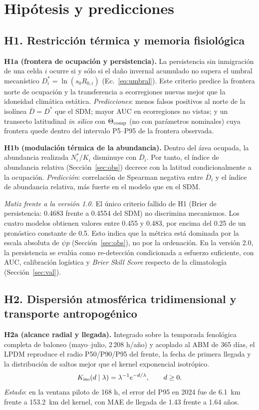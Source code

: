 \documentclass[11pt,letterpaper]{article}
\begin{document}
\section{Hipótesis y predicciones}
\label{sec:hip}
\subsection{H1. Restricción térmica y memoria fisiológica}
\textbf{H1a (frontera de ocupación y persistencia).} La persistencia sin inmigración de una celda $i$ ocurre si y sólo si el daño invernal acumulado no supera el umbral mecanístico $D^\ast_i=\ln(s_0R_{0,i})$ (Ec.~\ref{eq:umbral}). Este criterio predice la frontera norte de ocupación y la transferencia a ecorregiones nuevas mejor que la idoneidad climática estática.
\emph{Predicciones}: menos falsos positivos al norte de la isolínea $\overline D=D^\ast$ que el SDM; mayor AUC en ecorregiones no vistas; y un transecto latitudinal \emph{in silico} con $\Theta_{\rm comp}$ (no con parámetros nominales) cuya frontera quede dentro del intervalo P5--P95 de la frontera observada.

\textbf{H1b (modulación térmica de la abundancia).} Dentro del área ocupada, la abundancia realizada $N^\ast_i/K_i$ disminuye con $\overline D_i$. Por tanto, el índice de abundancia relativa (Sección~\ref{sec:obs}) decrece con la latitud condicionalmente a la ocupación.
\emph{Predicción}: correlación de Spearman negativa entre $\overline D_i$ y el índice de abundancia relativa, más fuerte en el modelo que en el SDM.

\textit{Matiz frente a la versión 1.0.} El único criterio fallido de H1 (Brier de persistencia: 0.4683 frente a 0.4554 del SDM) no discrimina mecanismos. Los cuatro modelos obtienen valores entre 0.455 y 0.483, por encima del 0.25 de un pronóstico constante de 0.5. Esto indica que la métrica está dominada por la escala absoluta de $\psi p$ (Sección~\ref{sec:obs}), no por la ordenación. En la versión 2.0, la persistencia se evalúa como re-detección condicionada a esfuerzo suficiente, con AUC, calibración logística y \emph{Brier Skill Score} respecto de la climatología (Sección~\ref{sec:val}).

\subsection{H2. Dispersión atmosférica tridimensional y transporte antropogénico}
\textbf{H2a (alcance radial y llegada).} Integrado sobre la temporada fenológica completa de baloneo (mayo--julio, 2\,208 h/año) y acoplado al ABM de 365 días, el LPDM reproduce el radio P50/P90/P95 del frente, la fecha de primera llegada y la distribución de saltos mejor que el kernel exponencial isotrópico.
\begin{equation}K_{\rm iso}(d\mid\lambda)=\lambda^{-1}e^{-d/\lambda},\qquad d\ge0.\end{equation}
\emph{Estado}: en la ventana piloto de 168 h, el error del P95 en 2024 fue de 6.1~km frente a 153.2~km del kernel, con MAE de llegada de 1.43 frente a 1.64 años.
\end{document}
